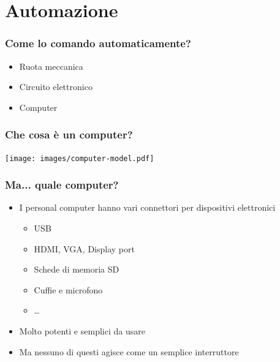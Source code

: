 \documentclass[xetex,table]{beamer}
\begin{document}
\section{Automazione}

\begin{frame}
  \frametitle{Come lo comando automaticamente?}
  \begin{itemize}
  \item Ruota meccanica
  \item Circuito elettronico
  \item Computer
  \end{itemize}
\end{frame}

\begin{frame}
  \frametitle{Che cosa è un computer?}
  \begin{center}
    \texttt{[image: images/computer-model.pdf]}
  \end{center}
\end{frame}

\begin{frame}
  \frametitle{Ma... quale computer?}
  \begin{itemize}
  \item I personal computer hanno vari connettori per dispositivi elettronici
    \begin{itemize}
    \item USB
    \item HDMI, VGA, Display port
    \item Schede di memoria SD
    \item Cuffie e microfono
    \item \dots
    \end{itemize}
  \item Molto potenti e semplici da usare
  \item Ma nessuno di questi agisce come un semplice interruttore
  \end{itemize}
\end{frame}
\end{document}
